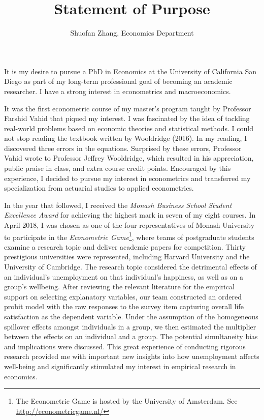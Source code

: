 \documentclass[12pt,]{article}
\title{Statement of Purpose}
\author{Shuofan Zhang, Economics Department}
\date{}
\let\rmarkdownfootnote\footnote%
\def\footnote{\protect\rmarkdownfootnote}
\begin{document}
\maketitle


It is my desire to pursue a PhD in Economics at the University of
California San Diego as part of my long-term professional goal of
becoming an academic researcher. I have a strong interest in
econometrics and macroeconomics.

It was the first econometric course of my master's program taught by
Professor Farshid Vahid that piqued my interest. I was fascinated by the
idea of tackling real-world problems based on economic theories and
statistical methods. I could not stop reading the textbook written by
Wooldridge (2016). In my reading, I discovered three errors in the
equations. Surprised by these errors, Professor Vahid wrote to Professor
Jeffrey Wooldridge, which resulted in his appreciation, public praise in
class, and extra course credit points. Encouraged by this experience, I
decided to pursue my interest in econometrics and transferred my
specialization from actuarial studies to applied econometrics.

In the year that followed, I received the \emph{Monash Business School
Student Excellence Award} for achieving the highest mark in seven of my
eight courses. In April 2018, I was chosen as one of the four
representatives of Monash University to participate in the
\emph{Econometric Game}\footnote{The Econometric Game is hosted by the
  University of Amsterdam. See \url{http://econometricgame.nl/}}, where
teams of postgraduate students examine a research topic and deliver
academic papers for competition. Thirty prestigious universities were
represented, including Harvard University and the University of
Cambridge. The research topic considered the detrimental effects of an
individual's unemployment on that individual's happiness, as well as on
a group's wellbeing. After reviewing the relevant literature for the
empirical support on selecting explanatory variables, our team
constructed an ordered probit model with the raw responses to the survey
item capturing overall life satisfaction as the dependent variable.
Under the assumption of the homogeneous spillover effects amongst
individuals in a group, we then estimated the multiplier between the
effects on an individual and a group. The potential simultaneity bias
and implications were discussed. This great experience of conducting
rigorous research provided me with important new insights into how
unemployment affects well-being and significantly stimulated my interest
in empirical research in economics.
\end{document}
